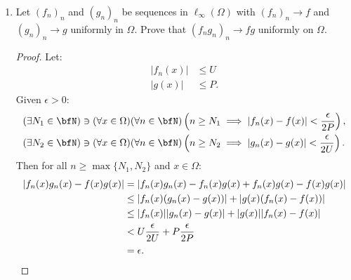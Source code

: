 \begin{enumerate}[label = (\arabic*)]
        \item Let $(f_n)_n$ and $(g_n)_n$ be sequences in $\ell_\infty(\Omega)$ with $(f_n)_n \rightarrow f$ and $(g_n)_n \rightarrow g$ uniformly in $\Omega$. Prove that $(f_n g_n)_n \rightarrow fg$ uniformly on $\Omega$.
            {\color{red} \begin{proof}
                Let:
                    \begin{equation*}
                    \begin{split}
                        |f_n(x)| &\leq U \\
                        |g(x)| &\leq P.
                    \end{split}
                    \end{equation*}
                Given $\epsilon > 0$:
                    \begin{equation*}
                    \begin{split}
                        (\exists N_1 \in \bfN) &\ni (\forall x \in \Omega)(\forall n \in \bfN)\left(n \geq N_1 \implies |f_n(x) - f(x)| < \frac{\epsilon}{2 P}\right), \\
                        (\exists N_2 \in \bfN)&\ni (\forall x \in \Omega)(\forall n \in \bfN)\left(n \geq N_2 \implies |g_n(x) - g(x)| < \frac{\epsilon}{2U}\right).
                    \end{split}
                    \end{equation*}
                Then for all $n \geq \max\{N_1,N_2\}$ and $x \in \Omega$:
                    \begin{equation*}
                    \begin{split}
                        |f_n(x)g_n(x) - f(x)g(x)|
                        & = |f_n(x)g_n(x) - f_n(x)g(x) + f_n(x)g(x) - f(x)g(x)| \\
                        & \leq |f_n(x)(g_n(x) - g(x))| + |g(x)(f_n(x) - f(x))| \\
                        & \leq |f_n(x)||g_n(x) - g(x)| + |g(x)||f_n(x) - f(x)| \\
                        & < U \frac{\epsilon}{2U} + P\frac{\epsilon}{2P} \\
                        & = \epsilon. \qedhere
                    \end{split}
                    \end{equation*}
            \end{proof}}
    \end{enumerate}
